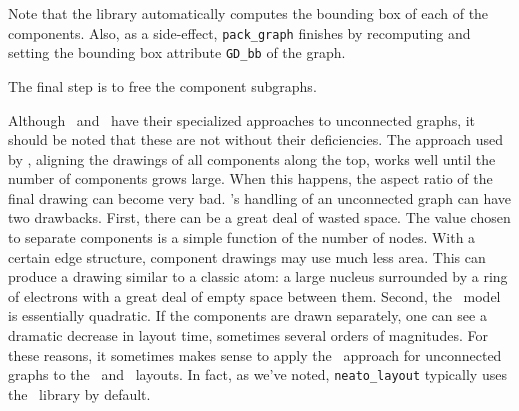 Note that the library automatically computes the bounding box of
each of the components. Also,
as a side-effect, {\tt pack\_graph} finishes by recomputing and
setting the bounding box attribute {\tt GD\_bb} of the graph.

The final step is to free the component subgraphs.

Although \dot\ and \neato\ have their specialized approaches to
unconnected graphs, it should be noted that these are not without
their deficiencies. The approach used by \dot, aligning the drawings
of all components along the top, works well until the
number of components grows large. When this happens, the aspect
ratio of the final drawing can become very bad. \neato 's handling
of an unconnected graph can have two drawbacks. First, there can be
a great deal of wasted space. The value chosen to separate
components is a simple function of the number of nodes. With a
certain edge structure, component drawings may use much less area.
This can produce a drawing similar to a classic atom: a large nucleus
surrounded by a ring of electrons with a great deal of empty space
between them. Second, the \neato\ model is essentially quadratic.
If the components are drawn separately, one can see a dramatic
decrease in layout time, sometimes several orders of magnitudes.
For these reasons, it sometimes makes sense to apply the \twopi\
approach for unconnected graphs to the \dot\ and \neato\ layouts.
In fact, as we've noted, {\tt neato\_layout} typically uses the \pack\
library by default.
